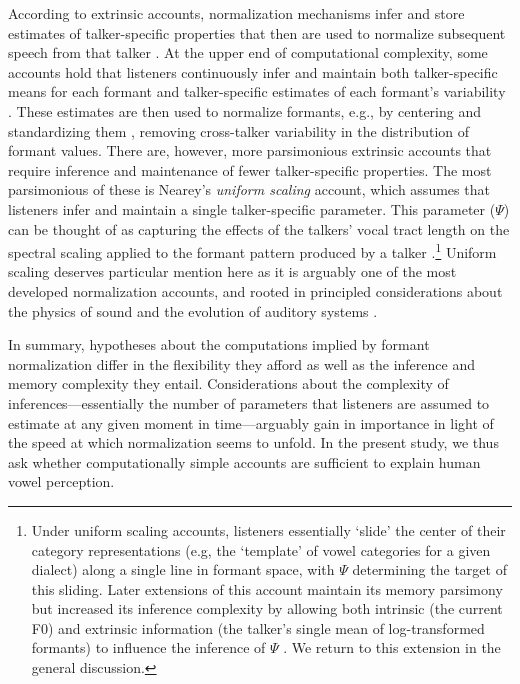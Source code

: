 \documentclass[preprint]{JASA}
\begin{document}
According to extrinsic accounts, normalization mechanisms infer and store estimates of talker-specific properties that then are used to normalize subsequent speech from that talker \citetext{\citealp{gerstman1968}; \citealp{lobanov1971}; \citealp{nearey1978}; \citealp{nordstrom-lindblom1975}; \citealp{watt-fabricius2002}; \citealp[for review, see also][]{weatherholtz-jaeger2016}}. At the upper end of computational complexity, some accounts hold that listeners continuously infer and maintain both talker-specific means for each formant and talker-specific estimates of each formant's variability \citep{gerstman1968, lobanov1971}. These estimates are then used to normalize formants, e.g., by centering and standardizing them \citep[essentially z-scoring formants,][]{lobanov1971}, removing cross-talker variability in the distribution of formant values. There are, however, more parsimonious extrinsic accounts that require inference and maintenance of fewer talker-specific properties. The most parsimonious of these is Nearey's \emph{uniform scaling} account, which assumes that listeners infer and maintain a single talker-specific parameter. This parameter (\(\Psi\)) can be thought of as capturing the effects of the talkers' vocal tract length on the spectral scaling applied to the formant pattern produced by a talker \citep{nearey1978}.\footnote{Under uniform scaling accounts, listeners essentially `slide' the center of their category representations (e.g, the `template' of vowel categories for a given dialect) along a single line in formant space, with \(\Psi\) determining the target of this sliding. Later extensions of this account maintain its memory parsimony but increased its inference complexity by allowing both intrinsic (the current F0) and extrinsic information (the talker's single mean of log-transformed formants) to influence the inference of \(\Psi\) \citep{nearey-assmann2007}. We return to this extension in the general discussion.} Uniform scaling deserves particular mention here as it is arguably one of the most developed normalization accounts, and rooted in principled considerations about the physics of sound and the evolution of auditory systems \citep[for review, see][]{barreda2020}.

In summary, hypotheses about the computations implied by formant normalization differ in the flexibility they afford as well as the inference and memory complexity they entail. Considerations about the complexity of inferences---essentially the number of parameters that listeners are assumed to estimate at any given moment in time---arguably gain in importance in light of the speed at which normalization seems to unfold. In the present study, we thus ask whether computationally simple accounts are sufficient to explain human vowel perception.
\end{document}

